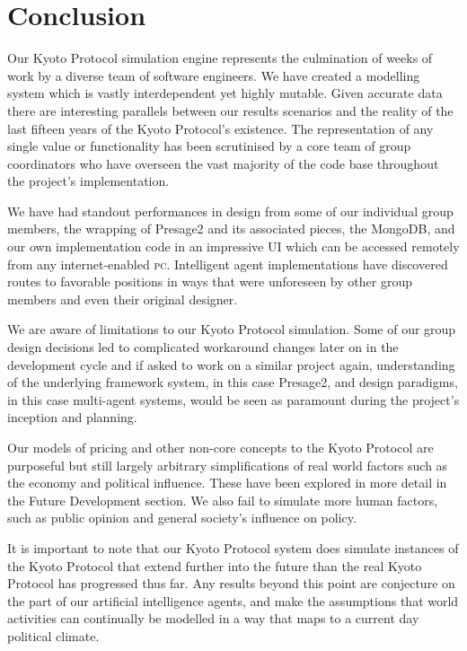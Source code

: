 \section{Conclusion}

Our Kyoto Protocol simulation engine represents the culmination of weeks of work by a diverse team of software engineers. We have created a modelling system which is vastly interdependent yet highly mutable. Given accurate data there are interesting parallels between our results scenarios and the reality of the last fifteen years of the Kyoto Protocol's existence. The representation of any single value or functionality has been scrutinised by a core team of group coordinators who have overseen the vast majority of the code base throughout the project's implementation.

We have had standout performances in design from some of our individual group members, the wrapping of Presage2 and its associated pieces, the MongoDB, and our own implementation code in an impressive UI which can be accessed remotely from any internet-enabled \textsc{pc}. Intelligent agent implementations have discovered routes to favorable positions in ways that were unforeseen by other group members and even their original designer.

We are aware of limitations to our Kyoto Protocol simulation. Some of our group design decisions led to complicated workaround changes later on in the development cycle and if asked to work on a similar project again, understanding of the underlying framework system, in this case Presage2, and design paradigms, in this case multi-agent systems, would be seen as paramount during the project's inception and planning.

Our models of pricing and other non-core concepts to the Kyoto Protocol are purposeful but still largely arbitrary simplifications of real world factors such as the economy and political influence. These have been explored in more detail in the Future Development section. We also fail to simulate more human factors, such as public opinion and general society's influence on policy.

It is important to note that our Kyoto Protocol system does simulate instances of the Kyoto Protocol that extend further into the future than the real Kyoto Protocol has progressed thus far. Any results beyond this point are conjecture on the part of our artificial intelligence agents, and make the assumptions that world activities can continually be modelled in a way that maps to a current day political climate.

